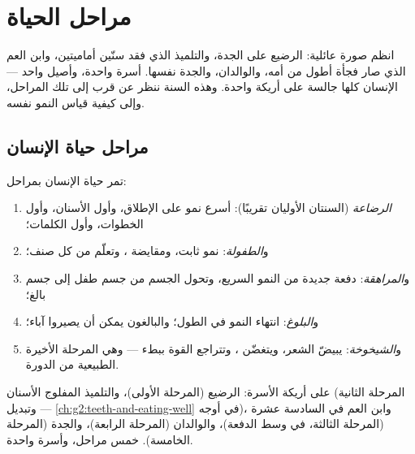 \chapter{مراحل الحياة}\label{ch:g3:stages-of-life}

انظم صورة عائلية: الرضيع على  الجدة، والتلميذ الذي فقد سنّين
أماميتين، وابن العم  الذي صار فجأة أطول من أمه، والوالدان،
والجدة نفسها. أسرة واحدة، وأصيل واحد ---  الإنسان كلها
جالسة على أريكة واحدة. وهذه السنة ننظر عن قرب إلى تلك المراحل،
وإلى كيفية قياس النمو نفسه.

\section{مراحل حياة الإنسان}

\begin{definition}\label{def:g3:stages-of-life:stages}
تمر حياة الإنسان بمراحل:
\begin{enumerate}
  \item \emph{الرضاعة} (السنتان الأوليان تقريبًا):
        أسرع نمو على الإطلاق، وأول الأسنان، وأول الخطوات، وأول
        الكلمات؛
  \item و\emph{الطفولة}: نمو ثابت، ومقايضة  ، وتعلّم من كل صنف؛
  \item و\emph{المراهقة}: دفعة جديدة من النمو
        السريع، وتحول الجسم من جسم طفل إلى جسم بالغ؛
  \item و\emph{البلوغ}: انتهاء النمو في الطول؛
        والبالغون يمكن أن يصيروا آباء؛
  \item و\emph{الشيخوخة}: يبيضّ الشعر، ويتغضّن
        ، وتتراجع القوة ببطء --- وهي المرحلة الأخيرة
        الطبيعية من الدورة.
\end{enumerate}
\end{definition}

\begin{example}\label{ex:g3:stages-of-life:sofa}
على أريكة الأسرة: الرضيع (المرحلة الأولى)، والتلميذ المفلوج
الأسنان (المرحلة الثانية --- وتبديل \cref{ch:g2:teeth-and-eating-well}
في أوجه)، وابن العم في السادسة عشرة (المرحلة الثالثة، في وسط
الدفعة)، والوالدان (المرحلة الرابعة)، والجدة (المرحلة الخامسة).
خمس مراحل، وأسرة واحدة.
\end{example}

